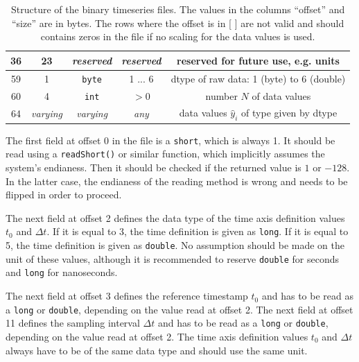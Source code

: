\documentclass[a4paper,10pt]{article}
\begin{document}
\begin{table}[htbp]
\begin{tabular}{|c|c|c|c|c|}
    \hline                                                                                 
    36     & 23               & \textit{reserved}                & \textit{reserved} & reserved for future use, e.g. units \\
    \hline                                                                                 
    59     & 1                & \texttt{byte}                    & 1 ... 6           & dtype of raw data: 1 (byte) to 6 (double) \\
    \hline                                                              
    60     & 4                & \texttt{int}                     & $> 0$             & number $N$ of data values \\
    \hline
    64     & \textit{varying} & \textit{varying}                 & \textit{any}      & data values $\hat{y}_i$ of type given by dtype \\
    \hline
 \end{tabular}
 \caption{Structure of the binary timeseries files.
 The values in the columns ``offset'' and ``size'' are in bytes.
 The rows where the offset is in [ ] are not valid and should contains zeros in the file if no scaling for the data values is used.}
 \label{tab:structure}
\end{table}

The first field at offset 0 in the file is a \texttt{short}, which is always 1.
It should be read using a \texttt{readShort()} or similar function, which implicitly assumes the system's endianess.
Then it should be checked if the returned value is $1$ or $-128$.
In the latter case, the endianess of the reading method is wrong and needs to be flipped in order to proceed.

The next field at offset 2 defines the data type of the time axis definition values $t_0$ and $\Delta t$.
If it is equal to 3, the time definition is given as \texttt{long}.
If it is equal to 5, the time definition is given as \texttt{double}.
No assumption should be made on the unit of these values, although it is recommended to reserve \texttt{double} for seconds and
\texttt{long} for nanoseconds.

The next field at offset 3 defines the reference timestamp $t_0$ and has to be read as a \texttt{long} or \texttt{double},
depending on the value read at offset 2.
The next field at offset 11 defines the sampling interval $\Delta t$ and has to be read as a \texttt{long} or \texttt{double},
depending on the value read at offset 2.
The time axis definition values $t_0$ and $\Delta t$ always have to be of the same data type and should use the same unit.
\end{document}
